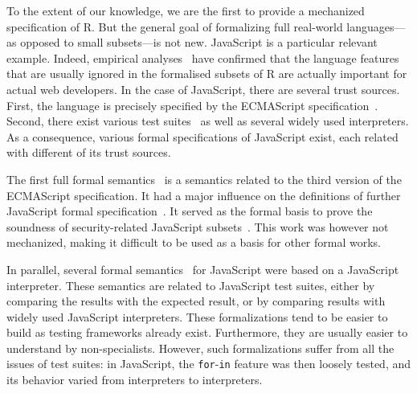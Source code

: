 \documentclass[
    sigplan,
    10pt,
    review, %
    natbib=false %
 ]{acmart}
\begin{document}
To the extent of our knowledge,
we are the first to provide a mechanized specification of R.
But the general goal of formalizing full real-world languages—%
as opposed to small subsets—is not new.
%
JavaScript is a particular relevant example.
Indeed, empirical analyses~\parencite{RichardsHBV11}
have confirmed that the language features
that are usually ignored in the formalised subsets of R
are actually important for actual web developers.
%
In the case of JavaScript, there are several trust sources.
First, the language is precisely specified by the ECMAScript specification~\parencite{es2019}.
Second, there exist various test suites~\parencite{test262, mozillatests}
as well as several widely used interpreters.
As a consequence, various formal specifications of JavaScript exist,
each related with different of its trust sources.

The first full formal semantics~\parencite{aplas08}
is a semantics related to the third version of the ECMAScript specification.
It had a major influence on the definitions of further JavaScript formal
specification~\parencite{ses, jscert, popl12-Towards, usenix}.
It served as the formal basis to prove the soundness of security-related
JavaScript subsets~\parencite{MMT-CSF-TR09, mmt-esorics09, mmt-oakland10}.
This work was however not mechanized, making it difficult to be used
as a basis for other formal works.

In parallel, several formal semantics~\parencite{js-ml, Guha2010, Politz:S5, kjs}
for JavaScript were based on a JavaScript interpreter.
These semantics are related to JavaScript test suites,
either by comparing the results with the expected result,
or by comparing results with widely used JavaScript interpreters.
These formalizations tend to be easier to build
as testing frameworks already exist.
Furthermore, they are usually easier to understand by non-specialists.
However, such formalizations suffer from all the issues of test suites:
in JavaScript, the \texttt{for}-\texttt{in}
feature was then loosely tested,
and its behavior varied from interpreters to interpreters.
\end{document}
